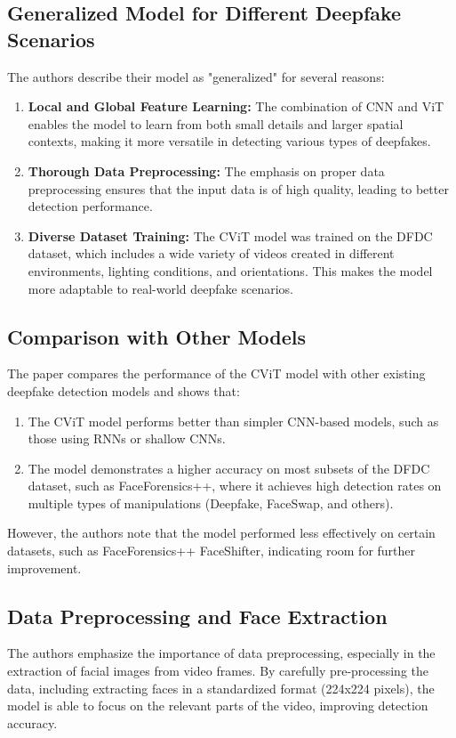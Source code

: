 \documentclass{report}
\begin{document}
	\subsection{Generalized Model for Different Deepfake Scenarios}
	The authors describe their model as "generalized" for several reasons:
	\begin{enumerate}
		\item 
		\textbf{Local and Global Feature Learning:} The combination of CNN and ViT enables the model to learn from both small details and larger spatial contexts, making it more versatile in detecting various types of deepfakes.
		
		\item 
		\textbf{Thorough Data Preprocessing:} The emphasis on proper data preprocessing ensures that the input data is of high quality, leading to better detection performance.
		
		\item 
		\textbf{Diverse Dataset Training:} The CViT model was trained on the DFDC dataset, which includes a wide variety of videos created in different environments, lighting conditions, and orientations. This makes the model more adaptable to real-world deepfake scenarios.		
	\end{enumerate}
	
	
	\subsection{Comparison with Other Models}
	The paper compares the performance of the CViT model with other existing deepfake detection models and shows that:
	\begin{enumerate}
		\item 
		The CViT model performs better than simpler CNN-based models, such as those using RNNs or shallow CNNs.
		
		\item 
		The model demonstrates a higher accuracy on most subsets of the DFDC dataset, such as FaceForensics++, where it achieves high detection rates on multiple types of manipulations (Deepfake, FaceSwap, and others).
	\end{enumerate}
	However, the authors note that the model performed less effectively on certain datasets, such as FaceForensics++ FaceShifter, indicating room for further improvement.
	
	
	
	\subsection{Data Preprocessing and Face Extraction}
	The authors emphasize the importance of data preprocessing, especially in the extraction of facial images from video frames. By carefully pre-processing the data, including extracting faces in a standardized format (224x224 pixels), the model is able to focus on the relevant parts of the video, improving detection accuracy.
	
\end{document}
